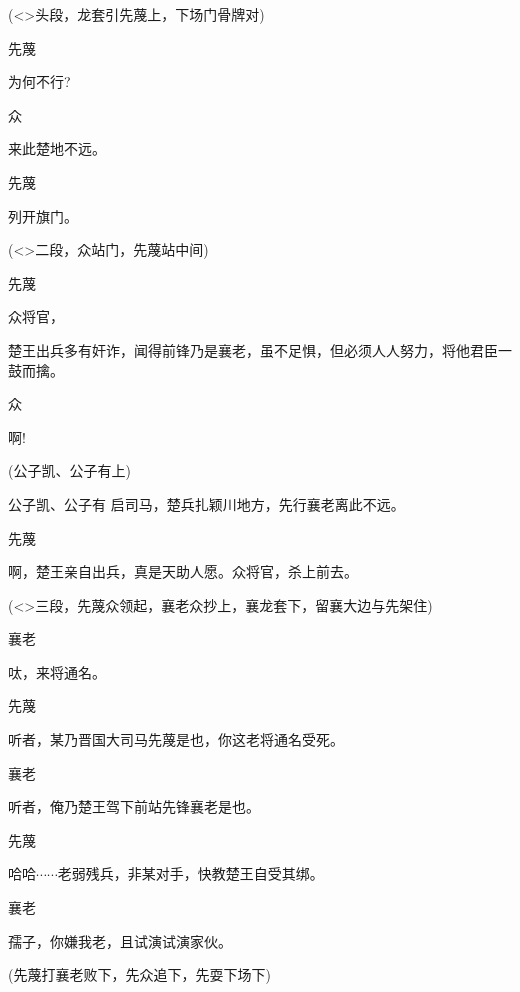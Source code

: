 {(\textless{}\!\textgreater{}头段，龙套引先蔑上，下场门骨牌对)

先蔑\hspace{30pt}~

为何不行?

众\hspace{40pt}~

来此楚地不远。

先蔑\hspace{30pt}~

列开旗门。

(\textless{}\!\textgreater{}二段，众站门，先蔑站中间)

先蔑\hspace{30pt}~

众将官，

楚王出兵多有奸诈，闻得前锋乃是襄老，虽不足惧，但必须人人努力，将他君臣一鼓而擒。

众\hspace{40pt}~

啊!

(公子凯、公子有上)

公子凯、公子有 启司马，楚兵扎颖川地方，先行襄老离此不远。

先蔑\hspace{30pt}~

啊，楚王亲自出兵，真是天助人愿。众将官，杀上前去。

(\textless{}\!\textgreater{}三段，先蔑众领起，襄老众抄上，襄龙套下，留襄大边与先架住)

襄老\hspace{30pt}~

呔，来将通名。

先蔑\hspace{30pt}~

听者，某乃晋国大司马先蔑是也，你这老将通名受死。

襄老\hspace{30pt}~

听者，俺乃楚王驾下前站先锋襄老是也。

先蔑\hspace{30pt}~

哈哈$\cdots{}\cdots{}$老弱残兵，非某对手，快教楚王自受其绑。

襄老\hspace{30pt}~

孺子，你嫌我老，且试演试演家伙。

(先蔑打襄老败下，先众追下，先耍下场下)

}
